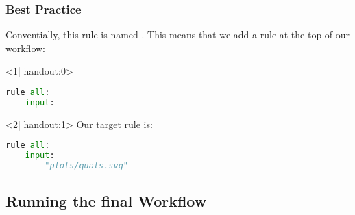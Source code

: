 \begin{frame}[fragile]
  \frametitle{Best Practice}
  Conventially, this rule is named . This means that we add a rule at the top of our workflow:\newline
  \begin{onlyenv}<1| handout:0>
   \begin{lstlisting}[language=Python,style=Python]
 rule all:
    input: 
   \end{lstlisting}
  \end{onlyenv}
  \begin{onlyenv}<2| handout:1>
   Our target rule is:
   \begin{lstlisting}[language=Python,style=Python]
 rule all:
    input: 
        "plots/quals.svg"
   \end{lstlisting}
  \end{onlyenv}
\end{frame}

\subsection{Running the final Workflow}

